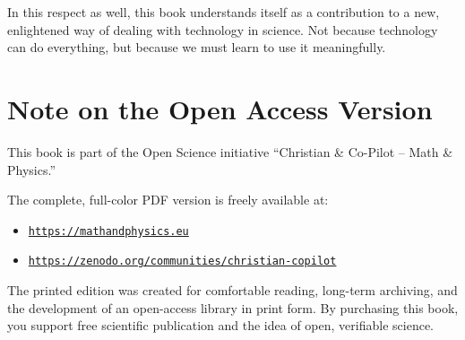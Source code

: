 In this respect as well,
this book understands itself as a contribution
to a new, enlightened way of dealing with technology in science.
Not because technology can do everything,
but because we must learn to use it meaningfully.

\vspace{1em}

\section*{Note on the Open Access Version}

This book is part of the Open Science initiative
``Christian \& Co-Pilot -- Math \& Physics.''

The complete, full-color PDF version is freely available at:

\begin{itemize}
	\item \href{https://mathandphysics.eu}{\texttt{https://mathandphysics.eu}}
	\item \href{https://zenodo.org/communities/christian-copilot}{\texttt{https://zenodo.org/communities/christian-copilot}}
\end{itemize}

The printed edition was created for comfortable reading,
long-term archiving,
and the development of an open-access library in print form.
By purchasing this book,
you support free scientific publication
and the idea of open, verifiable science.
